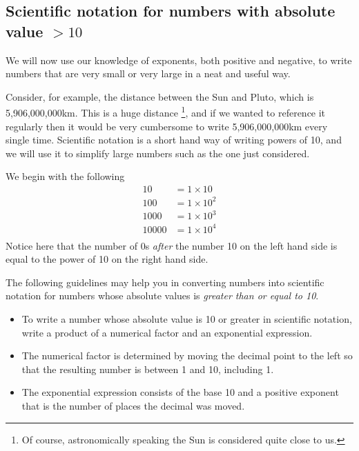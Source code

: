\subsection{Scientific notation for numbers with absolute value $>10$}
We will now use our knowledge of exponents, both positive and negative, to write numbers that are very small or
very large in a neat and useful way. 

Consider, for example, the distance between the Sun and Pluto, which is
5,906,000,000km. This is a huge distance \footnote{{Of course, astronomically speaking the Sun is considered quite close to us.}}, and if 
we wanted to reference it regularly then it would be very cumbersome to write 5,906,000,000km every single time. Scientific notation is a short
hand way of writing powers of 10, and we will use it to simplify large numbers such as the one just considered.

We begin with the following 
\begin{align*}
	10    & =  1 \times 10   \\
	100   & =  1 \times 10^2 \\
	1000  & =  1 \times 10^3 \\
	10000 & =  1 \times 10^4 \\
\end{align*}
Notice here that the number of 0s {\em after} the number 10 on the left hand side is equal to the power of 10 on 
the right hand side.

The following guidelines may help you in converting numbers into scientific notation for numbers whose absolute
values is {\em greater than or equal to 10}.
\begin{itemize}
	\item To write a number whose absolute value is 10 or greater in scientific notation, write a product of
	a numerical factor and an exponential expression.
	\item The numerical factor is determined by moving the decimal \gls{point} to the left so that the resulting
	number is between 1 and 10, including 1.
	\item The exponential expression consists of the base 10 and a positive exponent that is the number of places the
	decimal was moved.
\end{itemize} 


